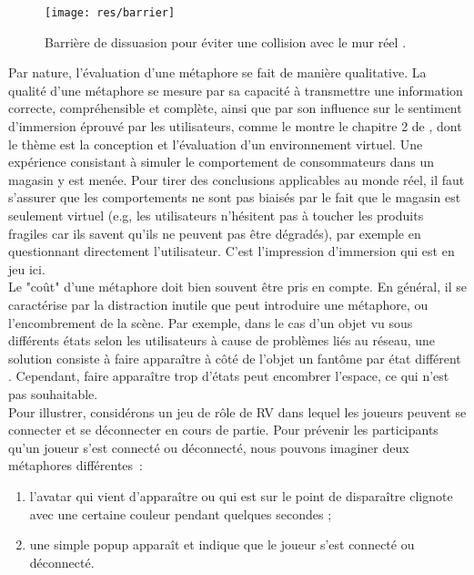 \documentclass[11pt]{article}
\begin{document}
\begin{figure}
\centering
\texttt{[image: res/barrier]}
\caption{\label{fig:barrier}Barrière de dissuasion pour éviter une collision avec le mur réel \cite{survey}.}
\end{figure}

Par nature, l'évaluation d'une métaphore se fait de manière qualitative. La qualité d'une métaphore se mesure par sa capacité à transmettre une information correcte, compréhensible et complète, ainsi que par son influence sur le sentiment d'immersion éprouvé par les utilisateurs, comme le montre le chapitre 2 de \cite{trv2}, dont le thème est la conception et l'évaluation d'un environnement virtuel. Une expérience consistant à simuler le comportement de consommateurs dans un magasin y est menée. Pour tirer des conclusions applicables au monde réel, il faut s'assurer que les comportements ne sont pas biaisés par le fait que le magasin est seulement virtuel (e.g, les utilisateurs n'hésitent pas à toucher les produits fragiles car ils savent qu'ils ne peuvent pas être dégradés), par exemple en questionnant directement l'utilisateur. C'est l'impression d'immersion qui est en jeu ici.
\\

Le "coût" d'une métaphore doit bien souvent être pris en compte. En général, il se caractérise par la distraction inutile que peut introduire une métaphore, ou l'encombrement de la scène. Par exemple, dans le cas d'un objet vu sous différents états selon les utilisateurs à cause de problèmes liés au réseau, une solution consiste à faire apparaître à côté de l'objet un fantôme par état différent \cite{network-errors}. Cependant, faire apparaître trop d'états peut encombrer l'espace, ce qui n'est pas souhaitable.
\\

Pour illustrer, considérons un jeu de rôle de RV dans lequel les joueurs peuvent se connecter et se déconnecter en cours de partie. Pour prévenir les participants qu'un joueur s'est connecté ou déconnecté, nous pouvons imaginer deux métaphores différentes~:
\begin{enumerate}
	\item l'avatar qui vient d'apparaître ou qui est sur le point de disparaître clignote avec une certaine couleur pendant quelques secondes ;
	\item une simple popup apparaît et indique que le joueur s'est connecté ou déconnecté.
\end{enumerate}
\end{document}
